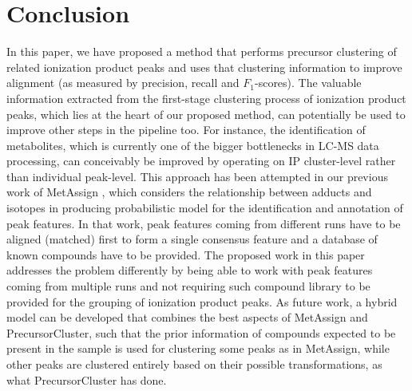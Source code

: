 \section{Conclusion}

In this paper, we have proposed a method that performs precursor clustering of related ionization product peaks and uses that clustering information to improve alignment (as measured by precision, recall and $F_1$-scores). The valuable information extracted from the first-stage clustering process of ionization product peaks, which lies at the heart of our proposed method, can potentially be used to improve other steps in the pipeline too. For instance, the identification of metabolites, which is currently one of the bigger bottlenecks in LC-MS data processing, can conceivably be improved by operating on IP cluster-level rather than individual peak-level. This approach has been attempted in our previous work of MetAssign \cite{Daly2014}, which considers the relationship between adducts and isotopes in producing probabilistic model for the identification and annotation of peak features. In that work, peak features coming from different runs have to be aligned (matched) first to form a single consensus feature and a database of known compounds have to be provided. The proposed work in this paper addresses the problem differently by being able to work with peak features coming from multiple runs and not requiring such compound library to be provided for the grouping of ionization product peaks. As future work, a hybrid model can be developed that combines the best aspects of MetAssign and PrecursorCluster, such that the prior information of compounds expected to be present in the sample is used for clustering some peaks as in MetAssign, while other peaks are clustered entirely based on their possible transformations, as what PrecursorCluster has done. 

